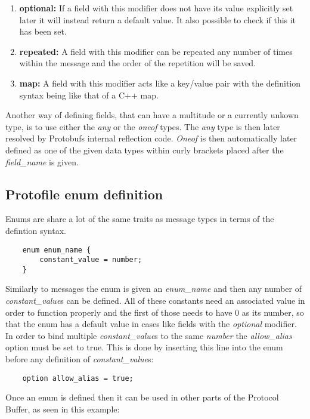 \begin{enumerate}
    \item \textbf{optional:} If a field with this modifier does not have its value explicitly set later it will instead return a default value. It also possible to check if this it has been set.
    \item \textbf{repeated:} A field with this modifier can be repeated any number of times within the message and the order of the repetition will be saved.
    \item \textbf{map:} A field with this modifier acts like a key/value pair with the definition syntax being like that of a C++ map.
\end{enumerate}

Another way of defining fields, that can have a multitude or a currently unkown type, is to use either the \textit{any} or the \textit{oneof} types.
The \textit{any} type is then later resolved by Protobufs internal reflection code.
\textit{Oneof} is then automatically later defined as one of the given data types within curly brackets placed after the \textit{field\_name} is given.

\subsection{Protofile enum definition}

Enums are share a lot of the same traits as message types in terms of the defintion syntax.

\begin{verbatim}
    enum enum_name {
        constant_value = number;
    }
\end{verbatim}

Similarly to messages the enum is given an \textit{enum\_name} and then any number of \textit{constant\_value}s can be defined. All of these constants need an associated
value in order to function properly and the first of those needs to have 0 as its number, so that the enum has a default value in cases like fields with the \textit{optional}
modifier. 
In order to bind multiple \textit{constant\_value}s to the same \textit{number} the \textit{allow\_alias} option must be set to true. This is done by inserting this line
into the enum before any definition of \textit{constant\_value}s:

\begin{verbatim}
    option allow_alias = true;
\end{verbatim}

Once an enum is defined then it can be used in other parts of the Protocol Buffer, as seen in this example:

